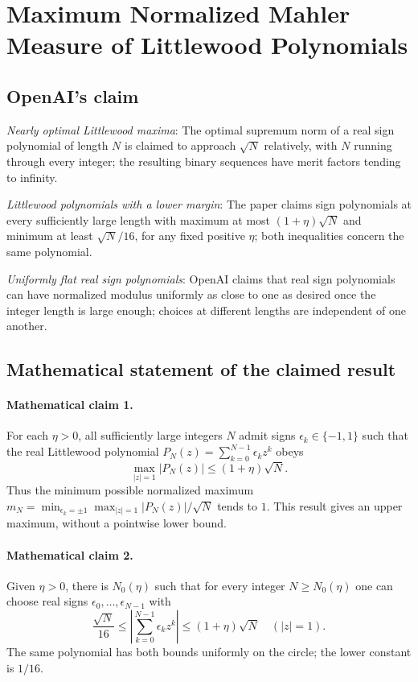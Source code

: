 \documentclass[11pt]{article}
\begin{document}
\section*{Maximum Normalized Mahler Measure of Littlewood Polynomials}

\subsection{OpenAI's claim}
\textit{Nearly optimal Littlewood maxima}: The optimal supremum norm of a real sign polynomial of length $N$ is claimed to approach $\sqrt N$ relatively, with $N$ running through every integer; the resulting binary sequences have merit factors tending to infinity.

\textit{Littlewood polynomials with a lower margin}: The paper claims sign polynomials at every sufficiently large length with maximum at most $(1+\eta)\sqrt N$ and minimum at least $\sqrt N/16$, for any fixed positive $\eta$; both inequalities concern the same polynomial.

\textit{Uniformly flat real sign polynomials}: OpenAI claims that real sign polynomials can have normalized modulus uniformly as close to one as desired once the integer length is large enough; choices at different lengths are independent of one another.

\subsection{Mathematical statement of the claimed result}
\paragraph{Mathematical claim 1.} For each $\eta>0$, all sufficiently large integers $N$ admit signs $\epsilon_k\in\{-1,1\}$ such that the real Littlewood polynomial $P_N(z)=\sum_{k=0}^{N-1}\epsilon_kz^k$ obeys \[\max_{|z|=1}|P_N(z)|\le(1+\eta)\sqrt N.\] Thus the minimum possible normalized maximum $m_N=\min_{\epsilon_k=\pm1}\max_{|z|=1}|P_N(z)|/\sqrt N$ tends to $1$. This result gives an upper maximum, without a pointwise lower bound.

\paragraph{Mathematical claim 2.} Given $\eta>0$, there is $N_0(\eta)$ such that for every integer $N\ge N_0(\eta)$ one can choose real signs $\epsilon_0,\ldots,\epsilon_{N-1}$ with \[\frac{\sqrt N}{16}\le\left|\sum_{k=0}^{N-1}\epsilon_kz^k\right|\le(1+\eta)\sqrt N\quad(|z|=1).\] The same polynomial has both bounds uniformly on the circle; the lower constant is $1/16$.
\end{document}
